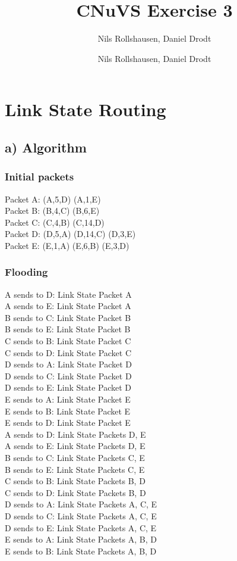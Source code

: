 \documentclass[a4paper, 11 pt, article, accentcolor=tud7b]{tudreport}
\title{CNuVS Exercise 3}
\author{Nils Rollshausen, Daniel Drodt}
\subtitle{Nils Rollshausen, Daniel Drodt}
\begin{document}
	\maketitle
	\section{Link State Routing}
	\subsection*{a) Algorithm}
	\subsubsection*{Initial packets}
	Packet A: (A,5,D) (A,1,E) \\
	Packet B: (B,4,C) (B,6,E) \\
	Packet C: (C,4,B) (C,14,D) \\
	Packet D: (D,5,A) (D,14,C) (D,3,E) \\
	Packet E: (E,1,A) (E,6,B) (E,3,D) \\
	\subsubsection*{Flooding}
	A sends to D: Link State Packet A \\
	A sends to E: Link State Packet A \\
	B sends to C: Link State Packet B \\
	B sends to E: Link State Packet B \\
	C sends to B: Link State Packet C \\
	C sends to D: Link State Packet C \\
	D sends to A: Link State Packet D \\
	D sends to C: Link State Packet D \\
	D sends to E: Link State Packet D \\
	E sends to A: Link State Packet E \\
	E sends to B: Link State Packet E \\
	E sends to D: Link State Packet E \medskip \\
	
	A sends to D: Link State Packets D, E \\
	A sends to E: Link State Packets D, E \\
	B sends to C: Link State Packets C, E \\
	B sends to E: Link State Packets C, E \\
	C sends to B: Link State Packets B, D \\
	C sends to D: Link State Packets B, D \\
	D sends to A: Link State Packets A, C, E \\
	D sends to C: Link State Packets A, C, E \\
	D sends to E: Link State Packets A, C, E \\
	E sends to A: Link State Packets A, B, D \\
	E sends to B: Link State Packets A, B, D \\
\end{document}
